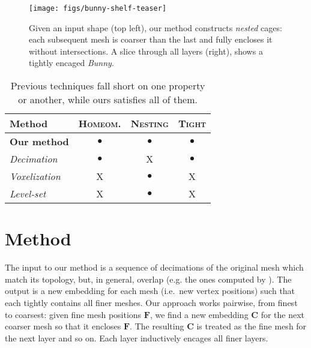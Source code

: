\documentclass{cgyrf15}
\newcommand{\ra}[1]{\renewcommand{\arraystretch}{#1}}
\newcommand{\NO}{{\color{red}\textsf{X}}}
\newcommand{\YES}{$\bullet$}
\begin{document}
\begin{figure}[t]
  \texttt{[image: figs/bunny-shelf-teaser]}
  \caption{Given an input shape (top left), our method constructs \emph{nested} cages:
each subsequent mesh is coarser than the last and fully encloses it without
intersections. A slice through all layers (right), shows a tightly
encaged \emph{Bunny}.\vspace*{-1em}
  }
  \label{fig:bunny-shelf-teaser}
\end{figure}

\begin{table}
\centering
\ra{1.0}
\setlength{\tabcolsep}{5.5pt}
\begin{tabularx}{\linewidth}{X c c c}
\rowcolor{white}
\toprule
Method               & \textsc{Homeom.} & \textsc{Nesting}& \textsc{Tight} \\
\midrule                                                                       
\textbf{Our method}  & \YES                  & \YES            & \YES           \\
\emph{Decimation}                                                               
                     & \YES                  & \NO             & \YES           \\
\emph{Voxelization}                                                             
                     & \NO                   & \YES            & \NO            \\
\emph{Level-set}                                                                
                     & \NO                   & \YES            & \NO            \\
\bottomrule
\end{tabularx}
\caption{
Previous techniques fall short
on one property or another, while ours satisfies all of them.}
\label{tab:feature-chart}
\end{table}

\section{Method}

The input to our method is a sequence of decimations of the original mesh which
match its topology, but, in general, overlap (e.g. the ones computed by
\cite{cgal}). The output is a new embedding for each mesh (i.e.\ new vertex
positions) such that each tightly contains all finer meshes. Our approach works
pairwise, from finest to coarsest: given fine mesh positions $\mathbf{F}$, we
find a new embedding $\mathbf{C}$ for the next coarser mesh so that it encloses
$\mathbf{F}$. The resulting $\mathbf{C}$ is treated as the fine mesh for the
next layer and so on. Each layer inductively encages all finer layers.
\end{document}
